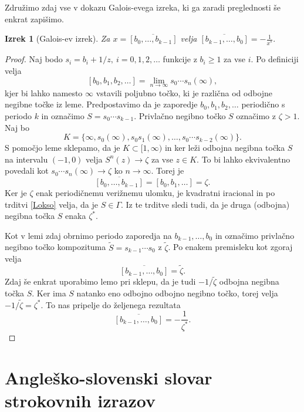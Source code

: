\documentclass[a4paper,12pt]{article}
\newtheorem*{izrek}{Izrek}
\newenvironment{dokaz}[1][Dokaz]{\begin{proof}}{\end{proof}}
\begin{document}
Združimo zdaj vse v dokazu Galois-evega izreka, ki ga zaradi preglednosti še enkrat zapišimo.

\begin{izrek}[Galois-ev izrek]
	Za $x = \overline{[b_0, \ldots, b_{k-1}]}$ velja $\overline{[b_{k-1}, \ldots, b_0]} = - \frac{1}{x^*}.$
\end{izrek}


\begin{dokaz}
    Naj bodo $s_i = b_i + 1/z,\ i = 0, 1, 2, \ldots$ funkcije z $b_i \geq 1$ za vse $i$. Po definiciji velja
    \[
        [b_0, b_1, b_2, \ldots] = \lim_{n \to \infty} s_0\cdots s_n (\infty),   
    \]
    kjer bi lahko namesto $\infty$ vstavili poljubno točko, ki je različna od odbojne negibne točke iz leme. Predpostavimo da je zaporedje $b_0, b_1, b_2, \ldots$ periodično s periodo $k$ in označimo $S = s_0\cdots s_{k-1}$. Privlačno negibno točko $S$ označimo z $\zeta > 1$. Naj bo
    \[
        K = \{ \infty, s_0(\infty), s_0s_1(\infty), \ldots, s_0\cdots s_{k-2}(\infty)\}.
    \]
    S pomočjo leme sklepamo, da je $K \subset [1, \infty)$ in ker leži odbojna negibna točka $S$ na intervalu $(-1, 0)$ velja $S^n(z) \to \zeta$ za vse $z \in K$. To bi lahko ekvivalentno povedali kot $s_0\cdots s_n(\infty) \to \zeta$ ko $n \to \infty$. Torej je
    \[
        \overline{[b_0, \ldots, b_{k-1}]} = [b_0, b_1,  \ldots] = \zeta.
    \] 
    Ker je $\zeta$ enak periodičnemu verižnemu ulomku, je kvadratni iracional in po trditvi \ref{Lokso} velja, da je $S \in \Gamma$. Iz te trditve sledi tudi, da je druga (odbojna) negibna točka $S$ enaka $\zeta^*$.

    Kot v lemi zdaj obrnimo periodo zaporedja na $b_{k-1}, \ldots, b_0$ in označimo privlačno negibno točko kompozituma $\tilde{S} = s_{k-1}\cdots s_0$ z $\tilde{\zeta}$. Po enakem premisleku kot zgoraj velja
    \[
        \overline{[b_{k-1}, \ldots, b_0]} = \tilde{\zeta}.
    \]
    Zdaj še enkrat uporabimo lemo pri sklepu, da je tudi $- 1 / \tilde{\zeta}$ odbojna negibna točka $S$. Ker ima $S$ natanko eno odbojno odbojno negibno točko, torej velja $- 1 / \tilde{\zeta} = \zeta^*$. To nas pripelje do željenega rezultata
    \[
        \overline{[b_{k-1}, \ldots, b_0]} = - \frac{1}{\zeta^*}.
    \]
\end{dokaz}
\newpage


\section*{Angleško-slovenski slovar strokovnih izrazov}
\end{document}
